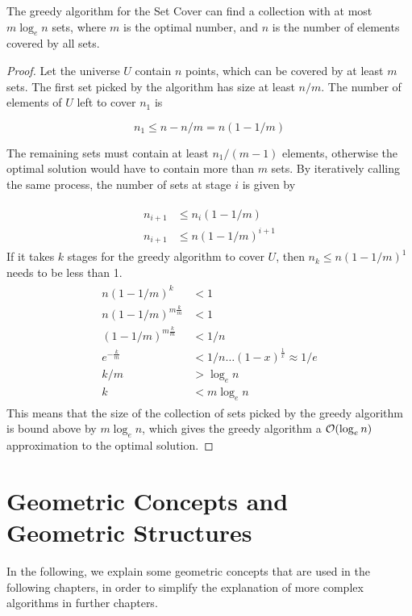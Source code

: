 \begin{theorem}
The greedy algorithm for the Set Cover can find a collection with at most $m \log_e n$ sets, where $m$ is the optimal number, and $n$ is the number of elements covered by all sets.

\begin{proof}
Let the universe $U$ contain $n$ points, which can be covered by at least $m$ sets. The first set picked by the algorithm has size at least $n/m$. The number of elements of $U$ left to cover $n_1$ is

\begin{equation}
n_1 \leq n - n/m = n(1-1/m)
\end{equation}

The remaining sets must contain at least $n_1/(m-1)$ elements, otherwise the optimal solution would have to contain more than $m$ sets. By iteratively calling the same process, the number of sets at stage $i$ is given by

\begin{align}
\begin{aligned}
n_{i+1} & \leq n_i(1-1/m) \\ 
n_{i+1} & \leq n(1-1/m)^{i+1}
\end{aligned}
\end{align}
If it takes $k$ stages for the greedy algorithm to cover $U$, then $n_k \leq n(1-1/m)^1$ needs to be less than 1.
\begin{align}
\begin{aligned}
n(1-1/m)^k & < 1 \\
n(1-1/m)^{m \frac{k}{m}} & < 1\\
(1-1/m)^{m \frac{k}{m}} & < 1/n\\
e^{-\frac{k}{m}} & < 1/n \ldots (1-x)^\frac{1}{x} \approx 1/e\\
k/m & > \log_e n \\
k & < m\log_e n
\end{aligned}
\end{align}
This means that the size of the collection of sets picked by the greedy algorithm is bound above by $m \log_e n$, which gives the greedy algorithm a $\mathcal{O}(\log_e n)$ approximation to the optimal solution.

\end{proof}
\end{theorem}



\section{Geometric Concepts and Geometric Structures}
In the following, we explain some geometric concepts that are used in the following chapters, in order to simplify the explanation of more complex algorithms in further chapters.
